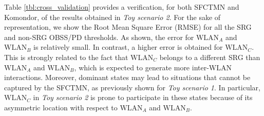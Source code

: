 \documentclass[preprint,12pt]{elsarticle}
\begin{document}
	Table \ref{tbl:cross_validation} provides a verification, for both SFCTMN and Komondor, of the results obtained in \emph{Toy scenario 2}. For the sake of representation, we show the Root Mean Square Error (RMSE) for all the SRG and non-SRG OBSS/PD thresholds. As shown, the error for $\text{WLAN}_A$ and $\text{WLAN}_B$ is relatively small. In contrast, a higher error is obtained for $\text{WLAN}_C$. This is strongly related to the fact that $\text{WLAN}_C$ belongs to a different SRG than $\text{WLAN}_A$ and $\text{WLAN}_B$, which is expected to generate more inter-WLAN interactions. Moreover, dominant states may lead to situations that cannot be captured by the SFCTMN, as previously shown for \emph{Toy scenario 1}. In particular, $\text{WLAN}_C$ in \emph{Toy scenario 2} is prone to participate in these states because of its asymmetric location with respect to $\text{WLAN}_A$ and $\text{WLAN}_B$.
	
	\begin{table}[]
		\centering
		\caption{Verification of the results obtained in \emph{Toy scenario 2} from the SFCTMN model and Komondor.}
		\label{tbl:cross_validation}
	\end{table}
	
	
\end{document}
